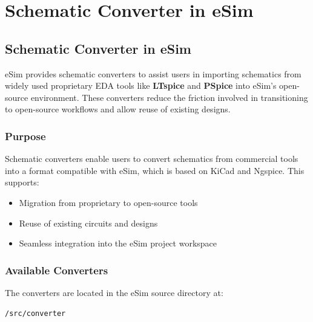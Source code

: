\chapter{Schematic Converter in eSim}
\thispagestyle{empty}
\label{chap13}

\section{Schematic Converter in eSim}
\label{sec:schematic-converters}

eSim provides schematic converters to assist users in importing schematics from widely used proprietary EDA tools like \textbf{LTspice} and \textbf{PSpice} into eSim’s open-source environment. These converters reduce the friction involved in transitioning to open-source workflows and allow reuse of existing designs.

\subsection{Purpose}
Schematic converters enable users to convert schematics from commercial tools into a format compatible with eSim, which is based on KiCad and Ngspice. This supports:

\begin{itemize}
  \item Migration from proprietary to open-source tools
  \item Reuse of existing circuits and designs
  \item Seamless integration into the eSim project workspace
\end{itemize}

\subsection{Available Converters}

The converters are located in the eSim source directory at:

\begin{verbatim}
/src/converter
\end{verbatim}

